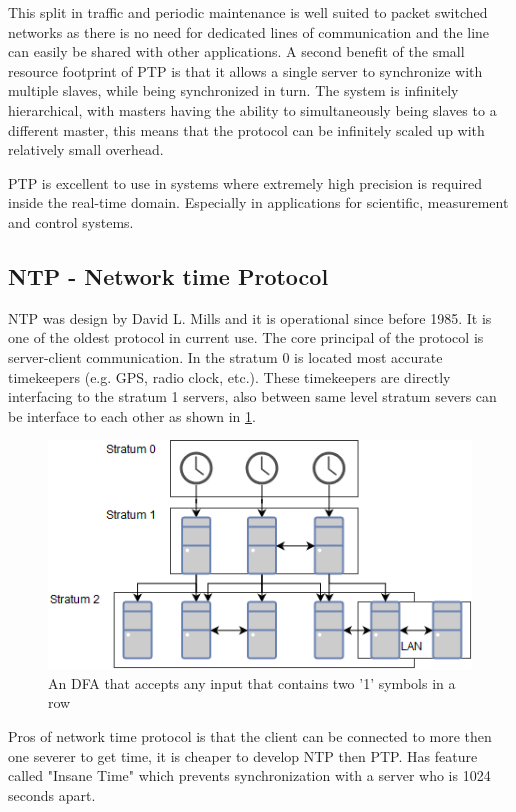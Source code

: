 \noindent This split in traffic and periodic maintenance is well suited to packet switched networks as there is no need for dedicated lines of communication and the line can easily be shared with other applications. A second benefit of the small resource footprint of PTP is that it allows a single server to synchronize with multiple slaves, while being synchronized in turn. The system is infinitely hierarchical, with masters having the ability to simultaneously being slaves to a different master, this means that the protocol can be infinitely scaled up with relatively small overhead.

\noindent PTP is excellent to use in systems where extremely high precision is required  inside the real-time domain. Especially in applications for scientific, measurement and control systems.

\subsection{NTP - Network time Protocol}

NTP was design by David L. Mills and it is operational since before 1985. It is one of the oldest protocol in
current use. The core principal of the protocol is server-client communication. In the stratum 0 is located
most accurate timekeepers (e.g. GPS, radio clock, etc.). These timekeepers are directly interfacing to the
stratum 1 servers, also between same level stratum severs can be interface to each other as shown in \ref{fig:NTP}.

\begin{figure}[H]\label{}
	\centering
	\includegraphics[scale=0.4]{synchronization/fig/NTP.png}
	\caption{An DFA that accepts any input that contains two '1' symbols in a row}
	\label{fig:NTP}
\end{figure}

\noindent Pros of network time protocol is that the client can be connected to more then one severer to get time, it is cheaper to develop NTP then PTP. Has feature called "Insane Time" which prevents synchronization with a server who is 1024 seconds apart.


